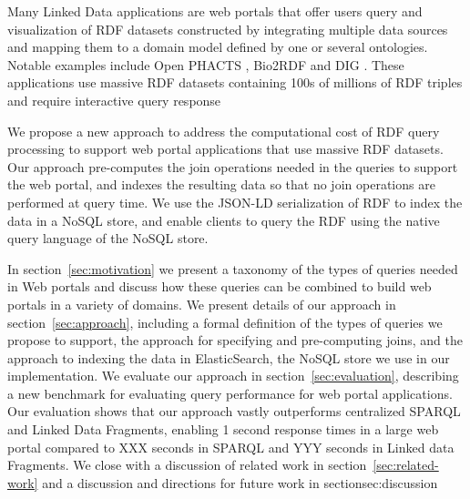 Many Linked Data applications are web portals that offer users query and visualization of RDF datasets constructed by integrating multiple data sources and mapping them to a domain model defined by one or several ontologies.
Notable examples include Open PHACTS \cite{Groth_Loizou_Gray_Goble_Harland_Pettifer_2014}, Bio2RDF \cite{callahan2013bio2rdf} and DIG \cite{szekely2015building}.
These applications use massive RDF datasets containing 100s of millions of RDF triples and require interactive query response

We propose a new approach to address the computational cost of RDF query processing to support web portal applications that use massive RDF datasets.
Our approach pre-computes the join operations needed in the queries to support the web portal, and indexes the resulting data so that no join operations are performed at query time.
We use the JSON-LD serialization of RDF \cite{Lanthaler:2012:UJC:2307819.2307827} to index the data in a NoSQL store, and enable clients to query the RDF using the native query language of the NoSQL store.

In section~\ref{sec:motivation} we present a taxonomy of the types of queries needed in Web portals and discuss how these queries can be combined to build web portals in a variety of domains.
We present details of our approach in section~\ref{sec:approach}, including a formal definition of the types of queries we propose to support, the approach for specifying and pre-computing joins, and the approach to indexing the data in ElasticSearch, the NoSQL store we use in our implementation.
We evaluate our approach in section~\ref{sec:evaluation}, describing a new benchmark for evaluating query performance for web portal applications. 
Our evaluation shows that our approach vastly outperforms centralized SPARQL and Linked Data Fragments, enabling 1 second response times in a large web portal compared to XXX seconds in SPARQL and YYY seconds in Linked data Fragments.
We close with a discussion of related work in section~\ref{sec:related-work} and a discussion and directions for future work in section{sec:discussion}
